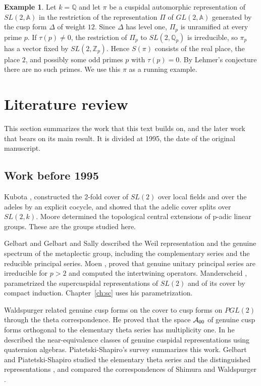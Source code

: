 \documentclass[12pt,letterpaper]{book}
\theoremstyle{plain}
\theoremstyle{definition}
\newtheorem{example}[theorem]{Example}
\theoremstyle{remark}
\theoremstyle{remark}
\begin{document}
\begin{example}
Let $k={\mathbb Q}$ and let $\pi$ be a cuspidal automorphic representation of
$SL(2,{\mathbb A})$ in the restriction of the representation $\Pi$ of
$GL(2,{\mathbb A})$ generated by the cusp form $\Delta$ of weight $12$. Since
$\Delta$ has level one, $\Pi_p$ is unramified at every prime $p$. If
$\tau(p)\neq0$, the restriction of $\Pi_p$ to $SL(2,{\mathbb Q}_p)$ is
irreducible, so $\pi_p$ has a vector fixed by $SL(2,{\mathbb Z}_p)$. Hence
$S(\pi)$ consists of the real place, the place $2$, and possibly some odd
primes $p$ with $\tau(p)=0$. By Lehmer's conjecture there are no such
primes. We use this $\pi$ as a running example.
\end{example}

\section{Literature review}\label{sec:litreview}

This section summarizes the work that this text builds on, and the later
work that bears on its main result. It is divided at 1995, the date of the
original manuscript.

\subsection*{Work before 1995}

Kubota \cite{K1}, \cite{K2} constructed the 2-fold cover of $SL(2)$ over
local fields and over the adeles by an explicit cocycle, and showed that
the adelic cover splits over $SL(2,k)$. Moore \cite{M} determined the
topological central extensions of p-adic linear groups. These are the
groups studied here.

Gelbart \cite{Ge2} and Gelbart and Sally \cite{GS} described the Weil
representation and the genuine spectrum of the metaplectic group,
including the complementary series and the reducible principal series.
Moen \cite{Mo1}, \cite{Mo2} proved that genuine unitary principal series
are irreducible for $p>2$ and computed the intertwining operators.
Manderscheid \cite{M1}, \cite{M2} parametrized the supercuspidal
representations of $SL(2)$ and of its cover by compact induction. Chapter~\ref{ch:sc}
uses his parametrization.

Waldspurger \cite{Wa1} related genuine cusp forms on the cover to cusp
forms on $PGL(2)$ through the theta correspondence. He proved that the
space ${\cal A}_{00}$ of genuine cusp forms orthogonal to the elementary
theta series has multiplicity one. In \cite{Wa2} he described the
near-equivalence classes of genuine cuspidal representations using
quaternion algebras. Piatetski-Shapiro's survey \cite{PS} summarizes this
work. Gelbart and Piatetski-Shapiro studied the elementary theta series
and the distinguished representations \cite{GePS}, and compared the
correspondences of Shimura and Waldspurger \cite{GPS}.
\end{document}
